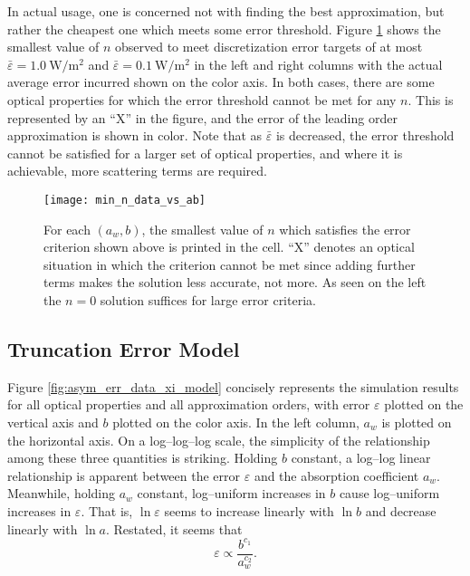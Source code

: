 In actual usage, one is concerned not with finding the best approximation, but rather the cheapest one which meets some error threshold.
Figure \ref{fig:min_n_data_vs_ab} shows the smallest value of $n$ observed to meet discretization error targets of at most $\bar{\varepsilon}=\SI{1.0}{\W\per\m\squared}$ and $\bar{\varepsilon}=\SI{0.1}{\W\per\m\squared}$ in the left and right columns with the actual average error incurred shown on the color axis.
In both cases, there are some optical properties for which the error threshold cannot be met for any $n$.
This is represented by an ``X'' in the figure, and the error of the leading order approximation is shown in color.
Note that as $\bar\varepsilon$ is decreased, the error threshold cannot be satisfied for a larger set of optical properties, and where it is achievable, more scattering terms are required.

\begin{figure}[H]
  \centering
  \texttt{[image: min\_n\_data\_vs\_ab]}
  \caption{For each $(a_w,b)$, the smallest value of $n$ which satisfies the error criterion shown above is printed in the cell. ``X'' denotes an optical situation in which the criterion cannot be met since adding further terms makes the solution less accurate, not more. As seen on the left the $n=0$ solution suffices for large error criteria.}
  \label{fig:min_n_data_vs_ab}
\end{figure}

\subsection{Truncation Error Model}
Figure \ref{fig:asym_err_data_xi_model} concisely represents the simulation results for all optical properties and all approximation orders, with error $\varepsilon$ plotted on the vertical axis and $b$ plotted on the color axis.
In the left column, $a_w$ is plotted on the horizontal axis.
On a log--log--log scale, the simplicity of the relationship among these three quantities is striking.
Holding $b$ constant, a log--log linear relationship is apparent between the error $\varepsilon$ and the absorption coefficient $a_w$.
Meanwhile, holding $a_w$ constant, log--uniform increases in $b$ cause log--uniform increases in $\varepsilon$.
That is, $\ln\varepsilon$ seems to increase linearly with $\ln b$ and decrease linearly with $\ln a$.
Restated, it seems that
\begin{equation}
  \varepsilon \propto \frac{b^{c_1}}{a_w^{c_2}}.
\end{equation}

